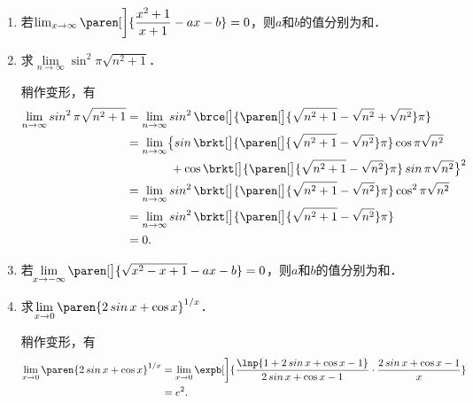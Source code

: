 \begin{enumerate}
\item 若\(\lim_{x\to\infty} \paren[\bigg]{\dfrac{x^2+1}{x+1} - ax -b} = 0\)，则\(a\)和\(b\)的值分别为\uline{}和\uline{}．

\item 求\(\lim\limits_{n\to\infty} \sin^2 \pi\sqrt{n^2+1}\)．

  \ifshowsol
    稍作变形，有
    \begin{align*}
      \lim_{n \to \infty} \sin^2 \pi\sqrt{n^2+1}
      &= \lim_{n \to \infty} \sin^2 \brce[\big]{\paren[\big]{\sqrt{n^2+1} - \sqrt{n^2} + \sqrt{n^2}} \pi} \\
      &= \lim_{n \to \infty}
        \bigl\lbrace
        \sin\brkt[\big]{\paren[\big]{\sqrt{n^2+1} - \sqrt{n^2}}\pi}
        \cos\pi\sqrt{n^2} \\
      &\hphantom{= \lim_{n \to \infty} \lbrace} +
        \cos\brkt[\big]{\paren[\big]{\sqrt{n^2+1} - \sqrt{n^2}}\pi}
        \sin\pi\sqrt{n^2}
        \bigr\rbrace^2 \\
      &= \lim_{n \to \infty}
        \sin^2\brkt[\big]{\paren[\big]{\sqrt{n^2+1} - \sqrt{n^2}}\pi}
        \cos^2\pi\sqrt{n^2} \\
      &= \lim_{n \to \infty} \sin^2\brkt[\big]{\paren[\big]{\sqrt{n^2+1} - \sqrt{n^2}}\pi} \\
      &= 0.
    \end{align*}
  \fi

\item 若\(\!\lim\limits_{x\to-\infty} \paren[\big]{\sqrt{x^2 - x + 1} - ax - b} = 0\)，则\(a\)和\(b\)的值分别为\uline{}和\uline{}．

\item 求\(\lim\limits_{x\to0} \paren{2 \sin x + \cos x}^{1/x}\)．

  \ifshowsol
    稍作变形，有
    \begin{align*}
      \lim_{x\to0} \paren{2 \sin x + \cos x}^{1/x}
      &= \lim_{x\to0} \expb[\bigg]{
        \frac{\lnp{1 + 2 \sin x + \cos x - 1}}{2 \sin x + \cos x - 1}
        \cdot
        \frac{2 \sin x + \cos x - 1}{x}} \\
      &= e^2.
    \end{align*}
  \fi


\end{enumerate}
